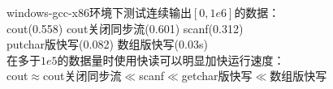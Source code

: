 windows-gcc-x86环境下测试连续输出$[0,1e6]$的数据：\\
cout(0.558)\quad
cout关闭同步流(0.601)\quad
scanf(0.312)\quad\\
putchar版快写(0.082)\quad
数组版快写(0.03s)\quad\\
在多于$1e5$的数据量时使用快读可以明显加快运行速度：\\
cout$\approx $cout关闭同步流$\ll$scanf$\ll$getchar版快写$\ll$数组版快写